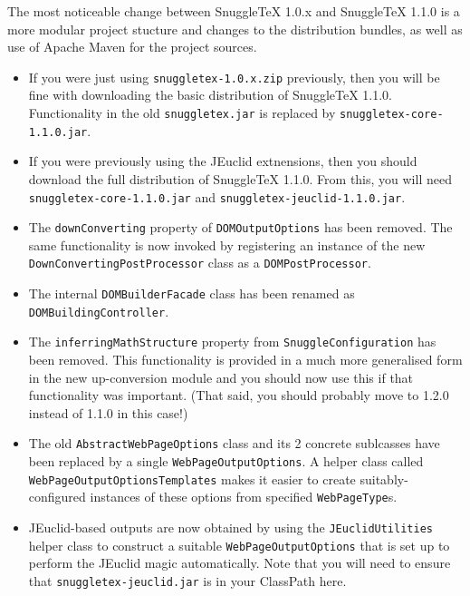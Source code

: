 
The most noticeable change between SnuggleTeX 1.0.x and SnuggleTeX 1.1.0 is a
more modular project stucture and changes to the distribution bundles, as well
as use of Apache Maven for the project sources.

\begin{itemize}

\item If you were just using \verb|snuggletex-1.0.x.zip| previously, then
you will be fine with downloading the basic distribution of SnuggleTeX 1.1.0.
Functionality in the old \verb|snuggletex.jar| is replaced by \verb|snuggletex-core-1.1.0.jar|.

\item If you were previously using the JEuclid extnensions, then you should
download the full distribution of SnuggleTeX 1.1.0. From this, you will need
\verb|snuggletex-core-1.1.0.jar| and \verb|snuggletex-jeuclid-1.1.0.jar|.

\item The \verb|downConverting| property of \verb|DOMOutputOptions| has been removed.
The same functionality is now invoked by registering an instance of the new
\verb|DownConvertingPostProcessor| class as a \verb|DOMPostProcessor|.

\item The internal \verb|DOMBuilderFacade| class has been renamed as \verb|DOMBuildingController|.

\item The \verb|inferringMathStructure| property from \verb|SnuggleConfiguration| has been removed.
This functionality is provided in a much more generalised form in the new up-conversion module and you
should now use this if that functionality was important. (That said, you should probably
move to 1.2.0 instead of 1.1.0 in this case!)

\item The old \verb|AbstractWebPageOptions| class and its 2 concrete sublcasses have
been replaced by a single \verb|WebPageOutputOptions|. A helper class called
\verb|WebPageOutputOptionsTemplates| makes it easier to create suitably-configured
instances of these options from specified \verb|WebPageType|s.

\item JEuclid-based outputs are now obtained by using the \verb|JEuclidUtilities|
helper class to construct a suitable \verb|WebPageOutputOptions| that is set up
to perform the JEuclid magic automatically. Note that you will need to ensure that
\verb|snuggletex-jeuclid.jar| is in your ClassPath here.

\end{itemize}
